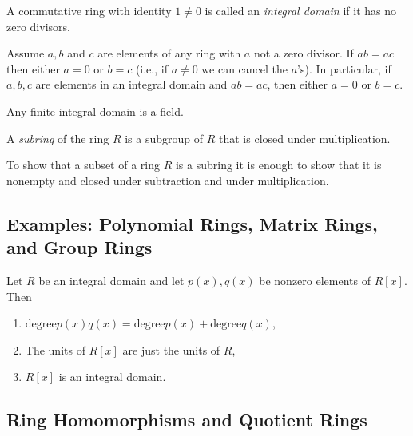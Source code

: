 \documentclass[../main]{subfiles}
\begin{document}
\begin{dfn}
 A commutative ring with identity $1 \neq 0$ is called an \textit{integral domain} if it has no zero divisors.
\end{dfn}


\begin{prop}
 Assume $a,b$ and $c$ are elements of any ring with $a$ not a zero divisor. If $ab = ac$ then either $a = 0$ or $b = c$ (i.e., if $a \neq 0$ we can cancel the $a$'s). In particular, if $a,b,c$ are elements in an integral domain and $ab = ac$, then either $a = 0$ or $b = c$.
\end{prop}


\begin{cor}
 Any finite integral domain is a field.
\end{cor}


\begin{dfn}
 A \textit{subring} of the ring $R$ is a subgroup of $R$ that is closed under multiplication.
\end{dfn}


\begin{nt}
 To show that a subset of a ring $R$ is a subring it is enough to show that it is nonempty and closed under subtraction and under multiplication.
\end{nt}


\subsection{Examples: Polynomial Rings, Matrix Rings, and Group Rings}



\begin{prop}
 Let $R$ be an integral domain and let $p(x), q(x)$ be nonzero elements of $R[x]$. Then 
 \begin{enumerate}
  \item $\text{degree} p(x) q(x) = \text{degree} p(x) + \text{degree} q(x)$,
  
  \item The units of $R[x]$ are just the units of $R$,
  
  \item $R[x]$ is an integral domain. 
 \end{enumerate}
\end{prop}


\subsection{Ring Homomorphisms and Quotient Rings}
\end{document}
